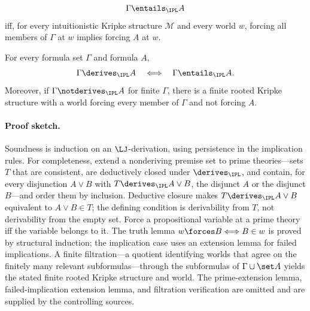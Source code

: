 
\begin{definition}
\[
  \Gamma\entails_{\IPL}A
\]
iff, for every intuitionistic Kripke structure \(\mathcal M\) and every
world \(w\), forcing all members of \(\Gamma\) at \(w\) implies forcing \(A\)
at \(w\).
\end{definition}

\begin{theorem}
For every formula set \(\Gamma\) and formula \(A\),
\[
  \Gamma\derives_{\IPL}A
  \quad\Longleftrightarrow\quad
  \Gamma\entails_{\IPL}A.
\]
Moreover, if \(\Gamma\notderives_{\IPL}A\) for finite \(\Gamma\), there is a
finite rooted Kripke structure with a world forcing every member of
\(\Gamma\) and not forcing \(A\).
\end{theorem}

\paragraph{Proof sketch.}
Soundness is induction on an \(\LJ\)-derivation, using persistence in the
implication rules.  For completeness, extend a nonderiving premise set to
prime theories---sets \(T\) that are consistent, are deductively closed
under \(\derives_{\IPL}\), and contain, for every disjunction \(A\lor B\)
with \(T\derives_{\IPL}A\lor B\), the disjunct \(A\) or the disjunct
\(B\)---and order them by inclusion.  Deductive closure makes
\(T\derives_{\IPL}A\lor B\) equivalent to \(A\lor B\in T\); the defining
condition is derivability from \(T\), not derivability from the empty set.
Force a propositional variable at a prime theory
iff the variable belongs to it.  The truth lemma
\(w\forces B\Longleftrightarrow B\in w\) is proved by structural induction;
the implication case uses an extension lemma for failed implications.  A
finite filtration---a quotient identifying worlds that agree on the
finitely many relevant subformulas---through the subformulas of
\(\Gamma\cup\set A\) yields the
stated finite rooted Kripke structure and world.  The prime-extension lemma,
failed-implication extension lemma, and filtration verification are omitted
and are supplied by the controlling sources.

